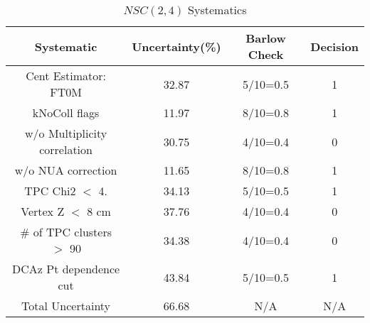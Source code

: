 \begin{table}[htbp]
\caption{$NSC(2,4)$ Systematics}
\label{tab:Sys_NSC24}
\centering
\begin{tabular}{|c|c|c|c|}
\hline
Systematic & Uncertainty(\%) & Barlow Check & Decision \\
\hline
Cent Estimator: FT0M & 32.87 & 5/10=0.5 & 1 \\
kNoColl flags & 11.97 & 8/10=0.8 & 1 \\
w/o Multiplicity correlation & 30.75 & 4/10=0.4 & 0 \\
w/o NUA correction & 11.65 & 8/10=0.8 & 1 \\
TPC Chi2 $<$ 4. & 34.13 & 5/10=0.5 & 1 \\
Vertex Z $<$ 8 cm & 37.76 & 4/10=0.4 & 0 \\
\# of TPC clusters $>$ 90 & 34.38 & 4/10=0.4 & 0 \\
DCAz Pt dependence cut & 43.84 & 5/10=0.5 & 1 \\
\hline
Total Uncertainty & 66.68 & N/A & N/A \\
\hline
\end{tabular}
\end{table}
